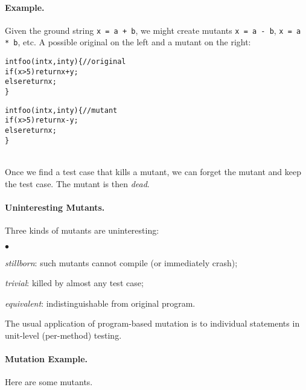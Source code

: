 \documentclass[11pt]{article}
\newcommand{\squishlist}{
 \begin{list}{$\bullet$}
  { \setlength{\itemsep}{0pt}
     \setlength{\parsep}{3pt}
     \setlength{\topsep}{3pt}
     \setlength{\partopsep}{0pt}
     \setlength{\leftmargin}{1.5em}
     \setlength{\labelwidth}{1em}
     \setlength{\labelsep}{0.5em} } }
\newcommand{\squishend}{
  \end{list}  }
\begin{document}
\paragraph{Example.} Given the ground string {\tt x = a + b},
we might create mutants {\tt x = a - b}, {\tt x = a * b}, etc.
A possible original on the
left and a mutant on the right:

\begin{minipage}{.5\textwidth} 
\begin{alltt}
int foo(int x, int y) \{ // original
  if (x > 5) return x + y;
  else return x;
\}
\end{alltt}
\end{minipage}\begin{minipage}{.5\textwidth}
\begin{alltt}
int foo(int x, int y) \{ // mutant
  if (x > 5) return x - y;
  else return x;
\}
\end{alltt}
\end{minipage}
~\\[3em]

Once we find a test case that kills a mutant, we can forget the
mutant and keep the test case. The mutant is then \emph{dead}.

\paragraph{Uninteresting Mutants.} Three kinds of mutants are uninteresting:
\squishlist
\item \emph{stillborn}: such mutants cannot compile (or immediately crash);
\item \emph{trivial}: killed by almost any test case;
\item \emph{equivalent}: indistinguishable from original program.
\squishend

The usual application of program-based mutation is to individual statements
in unit-level (per-method) testing.

\newpage
\paragraph{Mutation Example.} Here are some mutants.
\end{document}
